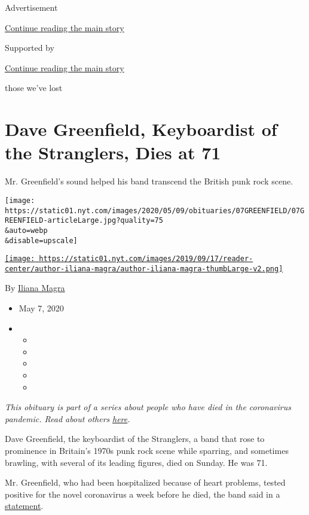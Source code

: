 Advertisement

\protect\hyperlink{after-top}{Continue reading the main story}

Supported by

\protect\hyperlink{after-sponsor}{Continue reading the main story}

those we've lost

\hypertarget{dave-greenfield-keyboardist-of-the-stranglers-dies-at-71}{%
\section{Dave Greenfield, Keyboardist of the Stranglers, Dies at
71}\label{dave-greenfield-keyboardist-of-the-stranglers-dies-at-71}}

Mr. Greenfield's sound helped his band transcend the British punk rock
scene.

\texttt{[image: https://static01.nyt.com/images/2020/05/09/obituaries/07GREENFIELD/07GREENFIELD-articleLarge.jpg?quality=75\\\&auto=webp\\\&disable=upscale]}

\href{https://www.nytimes.com/by/iliana-magra}{\texttt{[image: https://static01.nyt.com/images/2019/09/17/reader-center/author-iliana-magra/author-iliana-magra-thumbLarge-v2.png]}}

By \href{https://www.nytimes.com/by/iliana-magra}{Iliana Magra}

\begin{itemize}
\item
  May 7, 2020
\item
  \begin{itemize}
  \item
  \item
  \item
  \item
  \item
  \end{itemize}
\end{itemize}

\emph{This obituary is part of a series about people who have died in
the coronavirus pandemic. Read about others}
\href{https://www.nytimes.com/series/people-who-have-died-of-the-coronavirus}{\emph{here}}\emph{.}

Dave Greenfield, the keyboardist of the Stranglers, a band that rose to
prominence in Britain's 1970s punk rock scene while sparring, and
sometimes brawling, with several of its leading figures, died on Sunday.
He was 71.

Mr. Greenfield, who had been hospitalized because of heart problems,
tested positive for the novel coronavirus a week before he died, the
band said in a
\href{http://www.thestranglers.co.uk/?p=16131}{statement}.

